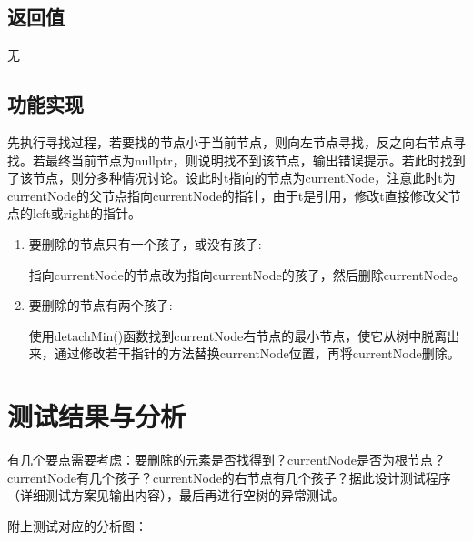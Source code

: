 \documentclass[UTF8]{ctexart}
\begin{document}
\subsection{返回值}
无
\subsection{功能实现}
先执行寻找过程，若要找的节点小于当前节点，则向左节点寻找，反之向右节点寻找。若最终当前节点为nullptr，则说明找不到该节点，输出错误提示。若此时找到了该节点，则分多种情况讨论。设此时t指向的节点为currentNode，注意此时t为currentNode的父节点指向currentNode的指针，由于t是引用，修改t直接修改父节点的left或right的指针。
\begin{enumerate}
\item 要删除的节点只有一个孩子，或没有孩子:

指向currentNode的节点改为指向currentNode的孩子，然后删除currentNode。
\item 要删除的节点有两个孩子:

使用detachMin()函数找到currentNode右节点的最小节点，使它从树中脱离出来，通过修改若干指针的方法替换currentNode位置，再将currentNode删除。
\end{enumerate}
\section{测试结果与分析}
有几个要点需要考虑：要删除的元素是否找得到？currentNode是否为根节点？currentNode有几个孩子？currentNode的右节点有几个孩子？据此设计测试程序（详细测试方案见输出内容），最后再进行空树的异常测试。

附上测试对应的分析图：
\end{document}
